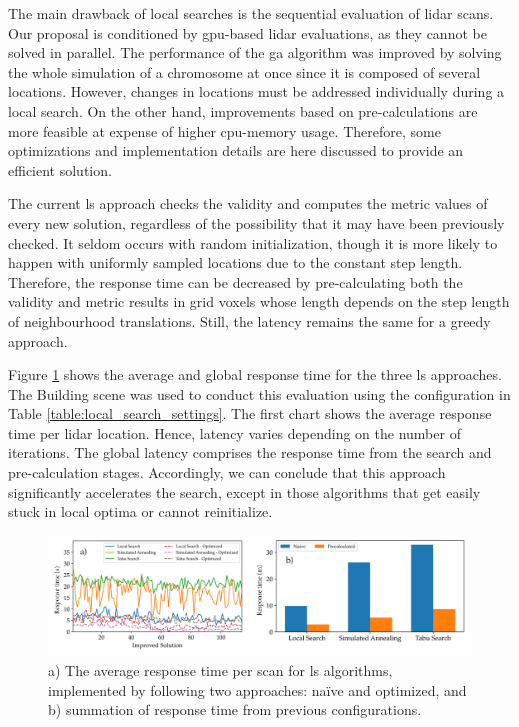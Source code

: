 The main drawback of local searches is the sequential evaluation of \acrshort{lidar} scans. Our proposal is conditioned by \acrshort{gpu}-based \acrshort{lidar} evaluations, as they cannot be solved in parallel. The performance of the \acrshort{ga} algorithm was improved by solving the whole simulation of a chromosome at once since it is composed of several locations. However, changes in locations must be addressed individually during a local search. On the other hand, improvements based on pre-calculations are more feasible at expense of higher \acrshort{cpu}-memory usage. Therefore, some optimizations and implementation details are here discussed to provide an efficient solution.

The current \acrshort{ls} approach checks the validity and computes the metric values of every new solution, regardless of the possibility that it may have been previously checked. It seldom occurs with random initialization, though it is more likely to happen with uniformly sampled locations due to the constant step length. Therefore, the response time can be decreased by pre-calculating both the validity and metric results in grid voxels whose length depends on the step length of neighbourhood translations. Still, the latency remains the same for a greedy approach. 

Figure \ref{fig:local_search_response_time} shows the average and global response time for the three \acrshort{ls} approaches. The Building scene was used to conduct this evaluation using the configuration in Table \ref{table:local_search_settings}. The first chart shows the average response time per \acrshort{lidar} location. Hence, latency varies depending on the number of iterations. The global latency comprises the response time from the search and pre-calculation stages. Accordingly, we can conclude that this approach significantly accelerates the search, except in those algorithms that get easily stuck in local optima or cannot reinitialize. 

\begin{figure}
    \centering
    \includegraphics[width=\linewidth]{figs/lidar_optimization/response_time_results.png}
	\caption{a) The average response time per scan for \acrshort{ls} algorithms, implemented by following two approaches: naïve and optimized, and b) summation of response time from previous configurations. }
	\label{fig:local_search_response_time}
\end{figure}

